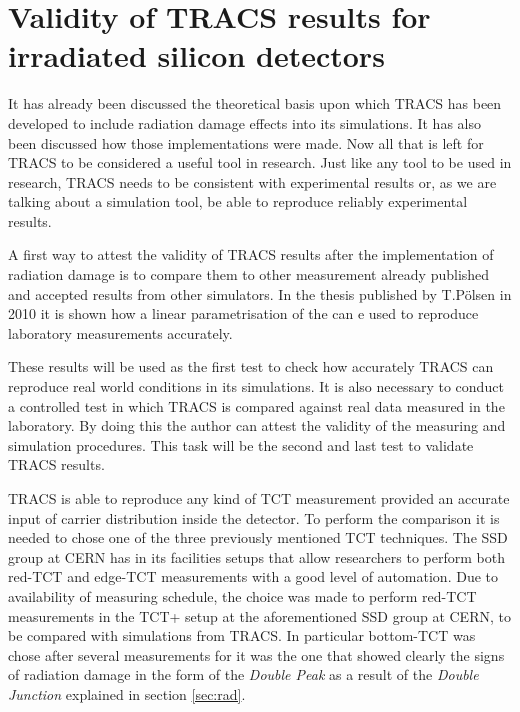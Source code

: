 \chapter{Validity of TRACS results for irradiated silicon detectors}

It has already been discussed the theoretical basis upon which TRACS has been developed to include radiation damage effects into its simulations. It has also been discussed how those implementations were made. Now all that is left for TRACS to be considered a useful tool in research. Just like any tool to be used in research, TRACS needs to be consistent with experimental results or, as we are talking about a simulation tool, be able to reproduce reliably experimental results.

A first way to attest the validity of TRACS results after the implementation of radiation damage is to compare them to other measurement already published and accepted results from other simulators. In the thesis published by T.P\"{o}lsen in 2010 it is shown how a linear parametrisation of the \neff can e used to reproduce laboratory measurements accurately. 

These results will be used as the first test to check how accurately TRACS can reproduce real world conditions in its simulations. It is also necessary to conduct a controlled test in which TRACS is compared against real data measured in the laboratory. By doing this the author can attest the validity of the measuring and simulation procedures. This task will be the second and last test to validate TRACS results.

TRACS is able to reproduce any kind of TCT measurement provided an accurate input of carrier distribution inside the detector. To perform the comparison it is needed to chose one of the three previously mentioned TCT techniques. The SSD group at CERN has in its facilities setups that allow researchers to perform both red-TCT and edge-TCT measurements with a good level of automation. Due to availability of measuring schedule, the choice was made to perform red-TCT measurements in the TCT+ setup at the aforementioned SSD group at CERN, to be compared with simulations from TRACS. In particular bottom-TCT was chose after several measurements for it was the one that showed clearly the signs of radiation damage in the form of the \textit{Double Peak} as a result of the \textit{Double Junction} explained in section \ref{sec:rad}. 

